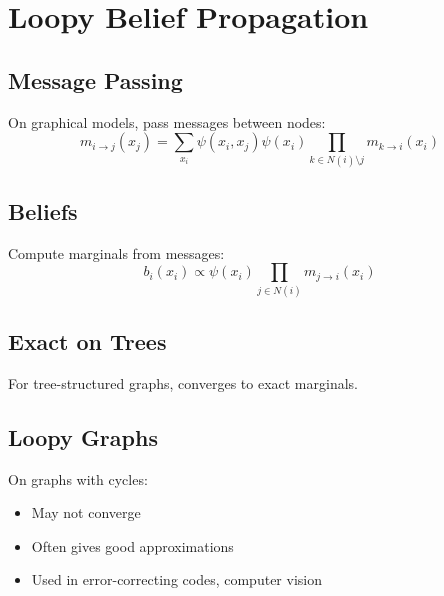 
\section{Loopy Belief Propagation}
\label{sec:loopy-bp}

\subsection{Message Passing}

On graphical models, pass messages between nodes:
\begin{equation}
m_{i \to j}(x_j) = \sum_{x_i} \psi(x_i, x_j) \psi(x_i) \prod_{k \in N(i) \setminus j} m_{k \to i}(x_i)
\end{equation}

\subsection{Beliefs}

Compute marginals from messages:
\begin{equation}
b_i(x_i) \propto \psi(x_i) \prod_{j \in N(i)} m_{j \to i}(x_i)
\end{equation}

\subsection{Exact on Trees}

For tree-structured graphs, converges to exact marginals.

\subsection{Loopy Graphs}

On graphs with cycles:
\begin{itemize}
    \item May not converge
    \item Often gives good approximations
    \item Used in error-correcting codes, computer vision
\end{itemize}

